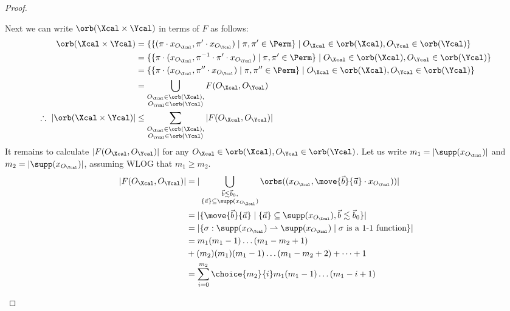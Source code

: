 \begin{proof}
\begin{enumerate}
	Next we can write $\orb(\Xcal \times \Ycal)$ in terms of $F$ as follows:
	\begin{align*}
		\orb(\Xcal\times \Ycal) &= \{\{(\pi \cdot x_{O_\Xcal},\pi'\cdot x_{O_\Ycal}) \mid \pi, \pi' \in \Perm\} \mid O_\Xcal \in \orb(\Xcal), O_\Ycal \in \orb(\Ycal)\}\\
		&= \{\{\pi\cdot (x_{O_\Xcal},\pi^{-1}\cdot \pi'\cdot x_{O_\Ycal}) \mid \pi, \pi' \in \Perm\} \mid O_\Xcal \in \orb(\Xcal), O_\Ycal \in \orb(\Ycal)\}\\
		&= \{\{\pi\cdot (x_{O_\Xcal},\pi''\cdot x_{O_\Ycal}) \mid \pi, \pi'' \in \Perm\} \mid O_\Xcal \in \orb(\Xcal), O_\Ycal \in \orb(\Ycal)\}\\
		&= \bigcup_{\substack{O_\Xcal \in \orb(\Xcal),\\ O_\Ycal \in \orb(\Ycal)}}F(O_\Xcal, O_\Ycal)\\
		\therefore\ |\orb(\Xcal \times \Ycal)| &\le \sum_{\substack{O_\Xcal \in \orb(\Xcal),\\ O_\Ycal \in \orb(\Ycal)}}|F(O_\Xcal, O_\Ycal)| 
	\end{align*}
	It remains to calculate $|F(O_\Xcal, O_\Ycal)|$ for any $O_\Xcal \in \orb(\Xcal), O_\Ycal \in \orb(\Ycal)$. 
	Let us write $m_1 = |\supp(x_{O_\Xcal})|$ and $m_2 = |\supp(x_{O_\Ycal})|$,  assuming WLOG that $m_1 \ge m_2$.
	\begin{align*}
		|F(O_\Xcal, O_\Ycal)| &= |\bigcup_{\substack{\vec b \lesssim \vec b_0,\\ \{\vec a\} \subseteq \supp(x_{O_\Xcal})}}\orbs((x_{O_\Xcal}, \move{\vec b}{\vec a}\cdot x_{O_\Ycal}))|\\
		&=
		|\{\move{\vec b}{\vec a} \mid \{\vec a\} \subseteq \supp(x_{O_\Xcal}), \vec b \lesssim \vec b_0\}|
		\\&= |\{\sigma: \supp(x_{O_\Ycal}) \rightharpoonup \supp(x_{O_\Xcal}) \mid \sigma\text{ is a 1-1 function}\}|
		\\ &= m_1(m_1 - 1)\dots(m_1 - m_2 + 1) 
		\\&+ (m_2)(m_1)(m_1 - 1)\dots(m_1 - m_2 + 2) + \dots + 1
		\\ &=\sum^{m_2}_{i = 0} \choice{m_2}{i} m_1(m_1 - 1)\dots(m_1 - i + 1)  

\end{align*}
\end{enumerate}
\end{proof}
